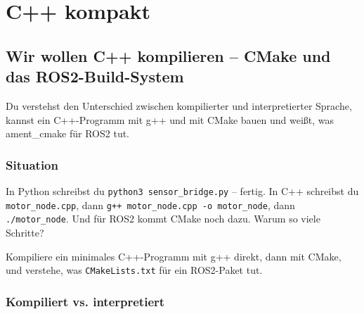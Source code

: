 
\part{C++ kompakt}

\chapter{Wir wollen C++ kompilieren – CMake und das ROS2-Build-System}

\begin{lernziele}
Du verstehst den Unterschied zwischen kompilierter und
interpretierter Sprache, kannst ein C++-Programm mit g++
und mit CMake bauen und weißt, was ament\_cmake für ROS2 tut.
\end{lernziele}

\section{Situation}

In Python schreibst du \texttt{python3 sensor\_bridge.py} -- fertig.
In C++ schreibst du \texttt{motor\_node.cpp},
dann \texttt{g++ motor\_node.cpp -o motor\_node},
dann \texttt{./motor\_node}.
Und für ROS2 kommt CMake noch dazu.
Warum so viele Schritte?

\begin{aufgabeBox}
Kompiliere ein minimales C++-Programm mit g++ direkt,
dann mit CMake, und verstehe, was \texttt{CMakeLists.txt}
für ein ROS2-Paket tut.
\end{aufgabeBox}

\section{Kompiliert vs. interpretiert}

